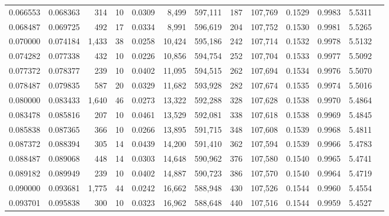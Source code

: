\begin{tabular}{rrrrrrrrrrrrr}
0.066553 & 0.068363 &   314 &  10 &                                     0.0309 &   8,499 & 597,111 &     187 & 107,769 & 0.1529 & 0.9983 & 5.5311 \\
0.068487 & 0.069725 &   492 &  17 &                                     0.0334 &   8,991 & 596,619 &     204 & 107,752 & 0.1530 & 0.9981 & 5.5265 \\
0.070000 & 0.074184 & 1,433 &  38 &                                     0.0258 &  10,424 & 595,186 &     242 & 107,714 & 0.1532 & 0.9978 & 5.5132 \\
0.074282 & 0.077338 &   432 &  10 &                                     0.0226 &  10,856 & 594,754 &     252 & 107,704 & 0.1533 & 0.9977 & 5.5092 \\
0.077372 & 0.078377 &   239 &  10 &                                     0.0402 &  11,095 & 594,515 &     262 & 107,694 & 0.1534 & 0.9976 & 5.5070 \\
0.078487 & 0.079835 &   587 &  20 &                                     0.0329 &  11,682 & 593,928 &     282 & 107,674 & 0.1535 & 0.9974 & 5.5016 \\
0.080000 & 0.083433 & 1,640 &  46 &                                     0.0273 &  13,322 & 592,288 &     328 & 107,628 & 0.1538 & 0.9970 & 5.4864 \\
0.083478 & 0.085816 &   207 &  10 &                                     0.0461 &  13,529 & 592,081 &     338 & 107,618 & 0.1538 & 0.9969 & 5.4845 \\
0.085838 & 0.087365 &   366 &  10 &                                     0.0266 &  13,895 & 591,715 &     348 & 107,608 & 0.1539 & 0.9968 & 5.4811 \\
0.087372 & 0.088394 &   305 &  14 &                                     0.0439 &  14,200 & 591,410 &     362 & 107,594 & 0.1539 & 0.9966 & 5.4783 \\
0.088487 & 0.089068 &   448 &  14 &                                     0.0303 &  14,648 & 590,962 &     376 & 107,580 & 0.1540 & 0.9965 & 5.4741 \\
0.089182 & 0.089949 &   239 &  10 &                                     0.0402 &  14,887 & 590,723 &     386 & 107,570 & 0.1540 & 0.9964 & 5.4719 \\
0.090000 & 0.093681 & 1,775 &  44 &                                     0.0242 &  16,662 & 588,948 &     430 & 107,526 & 0.1544 & 0.9960 & 5.4554 \\
0.093701 & 0.095838 &   300 &  10 &                                     0.0323 &  16,962 & 588,648 &     440 & 107,516 & 0.1544 & 0.9959 & 5.4527 \\

\end{tabular}
